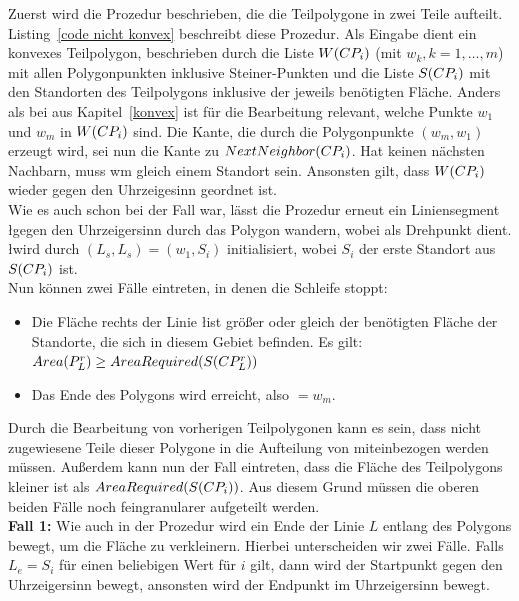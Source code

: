 \documentclass[ngerman]{seminarbeitrag}
\begin{document}
Zuerst wird die Prozedur \noncon beschrieben, die die Teilpolygone in zwei Teile aufteilt. Listing~\ref{code nicht konvex} beschreibt diese Prozedur.
Als Eingabe dient ein konvexes Teilpolygon, beschrieben durch die Liste $W(CP_{i})$ (mit $w_{k}, k = 1,…,m$) mit allen Polygonpunkten inklusive Steiner-Punkten und die Liste $S(CP_{i})$ mit den Standorten des Teilpolygons inklusive der jeweils benötigten Fläche.
Anders als bei \con aus Kapitel~\ref{konvex} ist für die Bearbeitung relevant, welche Punkte $w_{1}$ und $w_{m}$ in $W(CP_{i})$ sind. Die Kante, die durch die Polygonpunkte $(w_{m}, w_{1})$ erzeugt wird, sei nun die Kante zu $NextNeighbor(CP_{i})$. Hat \cpi keinen nächsten Nachbarn, muss wm gleich einem Standort sein. Ansonsten gilt, dass $W(CP_{i})$ wieder gegen den Uhrzeigesinn geordnet ist.\\

Wie es auch schon bei \con der Fall war, lässt die Prozedur erneut ein Liniensegment \l gegen den Uhrzeigersinn durch das Polygon \cpi wandern, wobei \ls als Drehpunkt dient. \l wird durch $(L_{s}, L_{s}) = (w_{1}, S_{i})$ initialisiert, wobei $S_{i}$ der erste Standort aus $S(CP_{i})$ ist.\\
Nun können zwei Fälle eintreten, in denen die Schleife stoppt:

\begin{itemize}
\item Die Fläche rechts der Linie \l ist größer oder gleich der benötigten Fläche der Standorte, die sich in diesem Gebiet befinden. Es gilt:
$Area(P_{L}^{r})\ge AreaRequired(S(CP_{L}^{r}))$
\item Das Ende des Polygons wird erreicht, also \Le $= w_{m}$.
\end{itemize}

Durch die Bearbeitung von vorherigen Teilpolygonen kann es sein, dass nicht zugewiesene Teile dieser Polygone in die Aufteilung von \cpi miteinbezogen werden müssen. Außerdem kann nun der Fall eintreten, dass die Fläche des Teilpolygons kleiner ist als $AreaRequired(S(CP_{i}))$. Aus diesem Grund müssen die oberen beiden Fälle noch feingranularer aufgeteilt werden.\\

\textbf{Fall 1:} Wie auch in der Prozedur \con wird ein Ende der Linie $L$ entlang des Polygons bewegt, um die Fläche \ar{\mprl}zu verkleinern. Hierbei unterscheiden wir zwei Fälle. Falls $L_{e} = S_{i}$ für einen beliebigen Wert für $i$ gilt, dann wird der Startpunkt \ls gegen den Uhrzeigersinn bewegt, ansonsten wird der Endpunkt \Le im Uhrzeigersinn bewegt.
\end{document}
